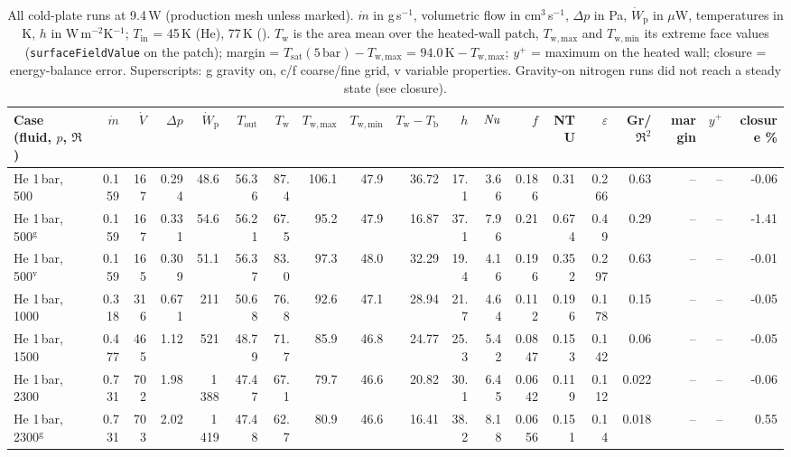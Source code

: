 \begin{table}[H]\centering\small
\caption{All cold-plate runs at 9.4\,W (production mesh unless marked). $\dot m$ in g\,s$^{-1}$, volumetric flow in cm$^3$\,s$^{-1}$, $\Delta p$ in Pa, $\dot W_{\mathrm p}$ in $\mu$W, temperatures in K, $h$ in W\,m$^{-2}$K$^{-1}$; $T_{\mathrm{in}}$ = 45\,K (He), 77\,K (\LNtwo). $T_{\mathrm w}$ is the area mean over the heated-wall patch, $T_{\mathrm{w,max}}$ and $T_{\mathrm{w,min}}$ its extreme face values (\texttt{surfaceFieldValue} on the patch); margin = $T_{\mathrm{sat}}(5\,\mathrm{bar})-T_{\mathrm{w,max}}$ = $94.0\,\mathrm K-T_{\mathrm{w,max}}$; $y^+$ = maximum on the heated wall; closure = energy-balance error. Superscripts: g gravity on, c/f coarse/fine grid, v variable properties. Gravity-on nitrogen runs did not reach a steady state (see closure).}
\label{tab:S6}
\setlength{\tabcolsep}{3pt}\renewcommand{\arraystretch}{1.2}
{\begin{tabular}{l r r r r r r r r r r r r r r r r r r}
\toprule
Case (fluid, $p$, $\Re$) & $\dot m$ & $\dot V$ & $\Delta p$ & $\dot W_{\mathrm p}$ & $T_{\mathrm{out}}$ & $T_{\mathrm w}$ & $T_{\mathrm{w,max}}$ & $T_{\mathrm{w,min}}$ & $T_{\mathrm w}-T_{\mathrm b}$ & $h$ & $\mathit{Nu}$ & $f$ & NTU & $\varepsilon$ & Gr/$\Re^2$ & margin & $y^+$ & closure \% \\
\midrule
He 1\,bar, 500 & 0.159 & 167 & 0.294 & 48.6 & 56.36 & 87.4 & 106.1 & 47.9 & 36.72 & 17.1 & 3.66 & 0.186 & 0.31 & 0.266 & 0.63 & -- & -- & -0.06 \\
He 1\,bar, 500$^{\mathrm{g}}$ & 0.159 & 167 & 0.331 & 54.6 & 56.21 & 67.5 & 95.2 & 47.9 & 16.87 & 37.1 & 7.96 & 0.21 & 0.674 & 0.49 & 0.29 & -- & -- & -1.41 \\
He 1\,bar, 500$^{\mathrm{v}}$ & 0.159 & 165 & 0.309 & 51.1 & 56.37 & 83.0 & 97.3 & 48.0 & 32.29 & 19.4 & 4.16 & 0.196 & 0.352 & 0.297 & 0.63 & -- & -- & -0.01 \\
He 1\,bar, 1000 & 0.318 & 316 & 0.671 & 211 & 50.68 & 76.8 & 92.6 & 47.1 & 28.94 & 21.7 & 4.64 & 0.112 & 0.196 & 0.178 & 0.15 & -- & -- & -0.05 \\
He 1\,bar, 1500 & 0.477 & 465 & 1.12 & 521 & 48.79 & 71.7 & 85.9 & 46.8 & 24.77 & 25.3 & 5.42 & 0.0847 & 0.153 & 0.142 & 0.06 & -- & -- & -0.05 \\
He 1\,bar, 2300 & 0.731 & 702 & 1.98 & 1\,388 & 47.47 & 67.1 & 79.7 & 46.6 & 20.82 & 30.1 & 6.45 & 0.0642 & 0.119 & 0.112 & 0.022 & -- & -- & -0.06 \\
He 1\,bar, 2300$^{\mathrm{g}}$ & 0.731 & 703 & 2.02 & 1\,419 & 47.48 & 62.7 & 80.9 & 46.6 & 16.41 & 38.2 & 8.18 & 0.0656 & 0.151 & 0.14 & 0.018 & -- & -- & 0.55 \\

\end{tabular}}
\end{table}
